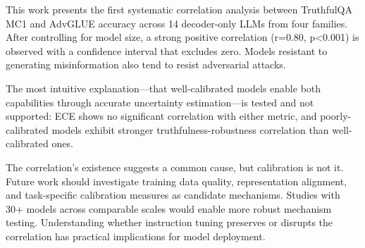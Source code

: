 
This work presents the first systematic correlation analysis between TruthfulQA MC1 and AdvGLUE accuracy across 14 decoder-only LLMs from four families. After controlling for model size, a strong positive correlation (r=0.80, p<0.001) is observed with a confidence interval that excludes zero. Models resistant to generating misinformation also tend to resist adversarial attacks.

The most intuitive explanation---that well-calibrated models enable both capabilities through accurate uncertainty estimation---is tested and not supported: ECE shows no significant correlation with either metric, and poorly-calibrated models exhibit stronger truthfulness-robustness correlation than well-calibrated ones.

The correlation's existence suggests a common cause, but calibration is not it. Future work should investigate training data quality, representation alignment, and task-specific calibration measures as candidate mechanisms. Studies with 30+ models across comparable scales would enable more robust mechanism testing. Understanding whether instruction tuning preserves or disrupts the correlation has practical implications for model deployment.

